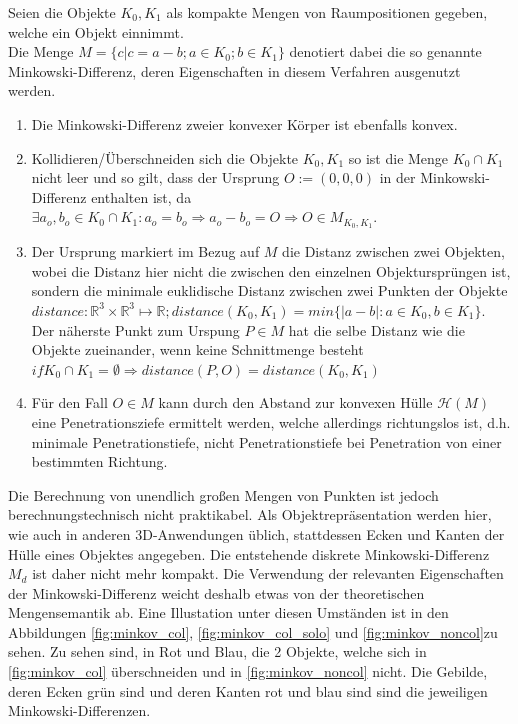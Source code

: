 		Seien die Objekte $K_0, K_1$ als kompakte Mengen von Raumpositionen gegeben, welche ein Objekt einnimmt.\\
		Die Menge $M = \{c | c = a - b; a\in K_0 ; b\in K_1\}$ denotiert dabei die so genannte Minkowski-Differenz, deren Eigenschaften in diesem Verfahren ausgenutzt werden.\\
		\begin{enumerate}
			\item Die Minkowski-Differenz zweier konvexer Körper ist ebenfalls konvex.
			\item Kollidieren/Überschneiden sich die Objekte $K_0, K_1$ so ist die Menge $K_0 \cap K_1$ nicht leer und so gilt, dass der Ursprung $O := (0,0,0)$ in der Minkowski-Differenz enthalten ist, da $\exists a_o, b_o \in K_0 \cap K_1 : a_o = b_o \Rightarrow a_o - b_o = O \Rightarrow O \in M_{K_0, K_1}$.
			\item Der Ursprung markiert im Bezug auf $M$ die Distanz zwischen zwei Objekten, wobei die Distanz hier nicht die zwischen den einzelnen Objektursprüngen ist, sondern die minimale euklidische Distanz zwischen zwei Punkten der Objekte $distance: \mathbb{R}^3 \times \mathbb{R}^3 \mapsto \mathbb{R}; distance(K_0, K_1) = min\{|a - b| : a \in K_0 , b\in K_1\}$. Der näherste Punkt zum Urspung $P\in M$ hat die selbe Distanz wie die Objekte zueinander, wenn keine Schnittmenge besteht $if K_0 \cap K_1 = \emptyset \Rightarrow distance(P, O) = distance(K_0, K_1)$
			\item Für den Fall $O \in M$ kann durch den Abstand zur konvexen Hülle $\mathcal{H}(M)$ eine Penetrationsziefe ermittelt werden, welche allerdings richtungslos ist, d.h. minimale Penetrationstiefe, nicht Penetrationstiefe bei Penetration von einer bestimmten Richtung.
		\end{enumerate}
		Die Berechnung von unendlich großen Mengen von Punkten ist jedoch berechnungstechnisch nicht praktikabel. Als Objektrepräsentation werden hier, wie auch in anderen 3D-Anwendungen üblich, stattdessen Ecken und Kanten der Hülle eines Objektes angegeben. Die entstehende diskrete Minkowski-Differenz $M_d$ ist daher nicht mehr kompakt. Die Verwendung der relevanten Eigenschaften der Minkowski-Differenz weicht deshalb etwas von der theoretischen Mengensemantik ab.
Eine Illustation unter diesen Umständen ist in den Abbildungen \ref{fig:minkov_col}, \ref{fig:minkov_col_solo} und \ref{fig:minkov_noncol}zu sehen. Zu sehen sind, in Rot und Blau, die 2 Objekte, welche sich in \ref{fig:minkov_col} überschneiden und in \ref{fig:minkov_noncol} nicht. Die Gebilde, deren Ecken grün sind und deren Kanten rot und blau sind sind die jeweiligen Minkowski-Differenzen.
